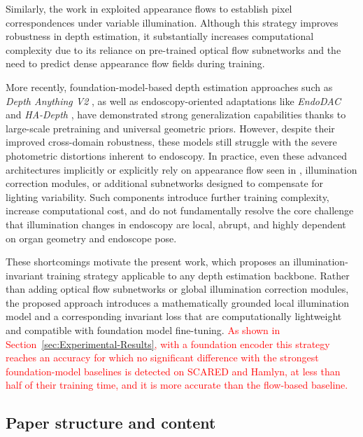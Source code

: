 \documentclass[a4paper,fleqn]{cas-dc}
\begin{document}
Similarly, the work in \citep{Shao_MIA_2022} exploited appearance flows to establish pixel correspondences under variable illumination. Although this strategy improves robustness in depth estimation, it substantially increases computational complexity due to its reliance on pre-trained optical flow subnetworks and the need to predict dense appearance flow fields during training.

More recently, foundation-model-based depth estimation approaches such as \emph{Depth Anything V2} \citep{DepthAnythingV2_2024}, as well as endoscopy-oriented adaptations like \emph{EndoDAC} \citep{EndoDAC_MICCAI_2024} and \emph{HA-Depth} \citep{HAdepth_2025}, have demonstrated strong generalization capabilities thanks to large-scale pretraining and universal geometric priors. However, despite their improved cross-domain robustness, these models still struggle with the severe photometric distortions inherent to endoscopy. In practice, even these advanced architectures implicitly or explicitly rely on appearance flow seen in \citep{Shao_MIA_2022} , illumination correction modules, or additional subnetworks designed to compensate for lighting variability. Such components introduce further training complexity, increase computational cost, and do not fundamentally resolve the core challenge that illumination changes in endoscopy are local, abrupt, and highly dependent on organ geometry and endoscope pose.

These shortcomings motivate the present work, which proposes an illumination-invariant training strategy applicable to any depth estimation backbone. Rather than adding optical flow subnetworks or global illumination correction modules, the proposed approach introduces a mathematically grounded local illumination model and a corresponding invariant loss that are computationally lightweight and compatible with 
foundation model fine-tuning. \textcolor{red}{As shown in Section~\ref{sec:Experimental-Results}, with a foundation encoder this strategy reaches an accuracy for which no significant difference with the strongest foundation-model baselines is detected on SCARED and Hamlyn, at less than half of their training time, and it is more accurate than the flow-based baseline.}
%
\subsection{Paper structure and content}
%
\end{document}
